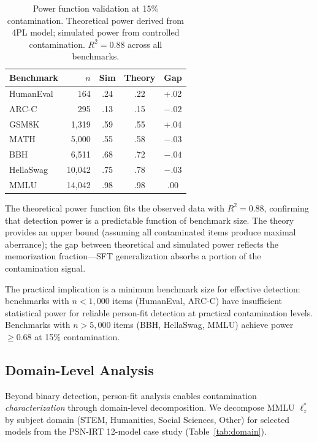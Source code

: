 \documentclass[11pt,a4paper]{article}
\begin{document}
\begin{table}[t]
\centering
\caption{Power function validation at 15\% contamination. Theoretical power derived from 4PL model; simulated power from controlled contamination. $R^2=0.88$ across all benchmarks.}
\label{tab:power}
\small
\begin{tabular}{lrccc}
\toprule
Benchmark & $n$ & Sim & Theory & Gap \\
\midrule
HumanEval & 164 & .24 & .22 & +.02 \\
ARC-C & 295 & .13 & .15 & $-.02$ \\
GSM8K & 1,319 & .59 & .55 & +.04 \\
MATH & 5,000 & .55 & .58 & $-.03$ \\
BBH & 6,511 & .68 & .72 & $-.04$ \\
HellaSwag & 10,042 & .75 & .78 & $-.03$ \\
MMLU & 14,042 & .98 & .98 & .00 \\
\bottomrule
\end{tabular}
\end{table}

The theoretical power function fits the observed data with $R^2=0.88$, confirming that detection power is a predictable function of benchmark size.
The theory provides an upper bound (assuming all contaminated items produce maximal aberrance); the gap between theoretical and simulated power reflects the memorization fraction---SFT generalization absorbs a portion of the contamination signal.

The practical implication is a minimum benchmark size for effective detection: benchmarks with $n < 1{,}000$ items (HumanEval, ARC-C) have insufficient statistical power for reliable person-fit detection at practical contamination levels.
Benchmarks with $n > 5{,}000$ items (BBH, HellaSwag, MMLU) achieve power $\geq 0.68$ at 15\% contamination.

\subsection{Domain-Level Analysis}
\label{sec:domain}

Beyond binary detection, person-fit analysis enables contamination \emph{characterization} through domain-level decomposition.
We decompose MMLU $\ell_z^*$ by subject domain (STEM, Humanities, Social Sciences, Other) for selected models from the PSN-IRT 12-model case study (Table~\ref{tab:domain}).
\end{document}
